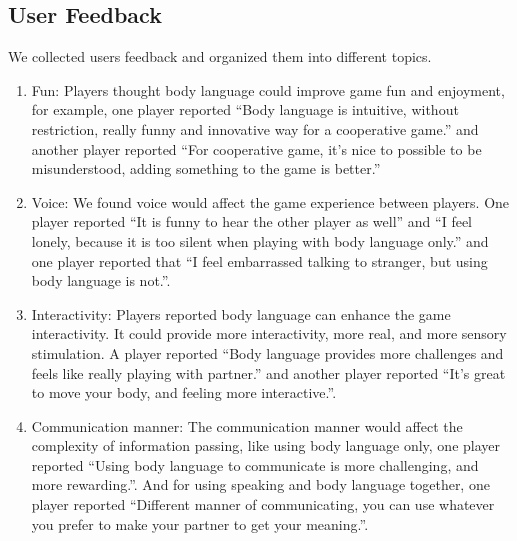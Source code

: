 \subsection{User Feedback}
	We collected users feedback and organized them into different topics.
\begin{enumerate}
  \item Fun:  Players thought body language could improve game fun and enjoyment, for example, one player reported ``Body language is intuitive, without restriction, really funny and innovative way for a cooperative game.'' and another player reported
	``For cooperative game, it's nice to possible to be misunderstood, adding something to the game is better.''


  \item Voice: We found voice would affect the game experience between players. One player reported ``It is funny to hear the other player as well'' and ``I feel lonely, because it is too silent when playing with body language only.''
and one player reported that ``I feel embarrassed talking to stranger, but using body language is not.''.

  \item Interactivity: Players reported body language can enhance the game interactivity. It could provide more interactivity, more real, and more sensory stimulation. A player reported ``Body language provides more challenges and feels like really playing with partner.'' and another player reported ``It's great to move your body, and feeling more interactive.''. 


  \item Communication manner: The communication manner would affect the complexity of information passing, like using body language only, one player reported ``Using body language to communicate is more challenging, and more rewarding.''. And for using speaking and body language together, one player reported ``Different manner of communicating, you can use whatever you prefer to make your partner to get your meaning.''. 

\end{enumerate}

